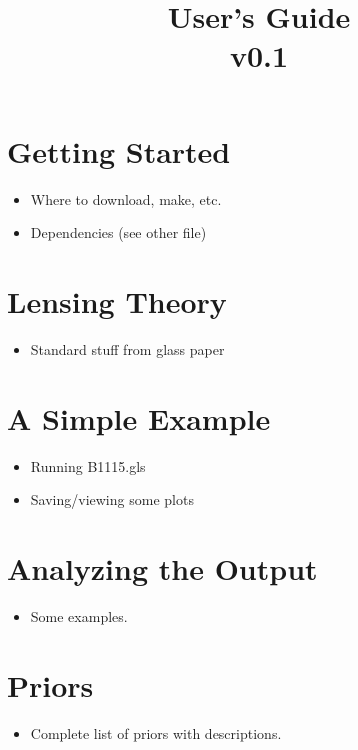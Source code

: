 \documentclass[a4paper]{report}
\title{\glass User's Guide \\ v0.1}
\author{}
\begin{document}
\maketitle

\tableofcontents

\chapter{Getting Started}
\begin{itemize}
\item Where to download, make, etc.
\item Dependencies (see other file)
\end{itemize}

\chapter{Lensing Theory}
\begin{itemize}
\item Standard stuff from glass paper
\end{itemize}

\chapter{A Simple Example}
\begin{itemize}
\item Running B1115.gls
\item Saving/viewing some plots
\end{itemize}

\chapter{Analyzing the Output}
\begin{itemize}
\item Some examples.
\end{itemize}

\chapter{Priors}
\begin{itemize}
\item Complete list of priors with descriptions.
\end{itemize}
\end{document}
